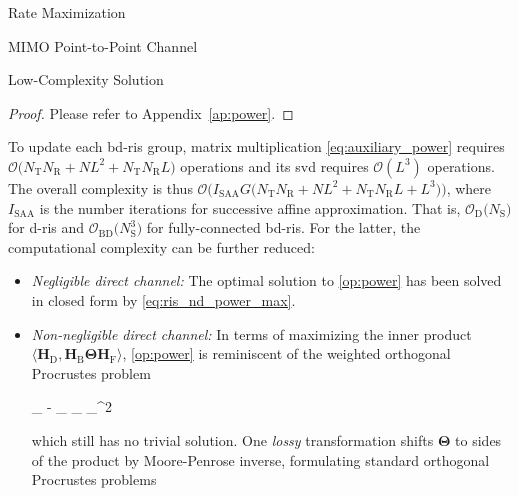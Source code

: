 \documentclass[journal]{IEEEtran}
\begin{document}
\begin{section}{Rate Maximization}
\begin{subsection}{MIMO Point-to-Point Channel}
\begin{subsubsection}{Low-Complexity Solution}
				\begin{proof}
					Please refer to Appendix~\ref{ap:power}.
				\end{proof}

				To update each \gls{bd}-\gls{ris} group, matrix multiplication \eqref{eq:auxiliary_power} requires $\mathcal{O}\bigl(N_\mathrm{T} N_\mathrm{R} + NL^2+N_\mathrm{T} N_\mathrm{R} L\bigr)$ operations and its \gls{svd} requires $\mathcal{O}(L^3)$ operations.
				The overall complexity is thus $\mathcal{O}\bigl(I_\text{SAA} G \bigl(N_\mathrm{T} N_\mathrm{R} + NL^2+N_\mathrm{T} N_\mathrm{R} L + L^3\bigr)\bigr)$, where $I_\text{SAA}$ is the number iterations for successive affine approximation.
				That is, $\mathcal{O}_\mathrm{D}\bigl(N_\mathrm{S}\bigr)$ for \gls{d}-\gls{ris} and $\mathcal{O}_\mathrm{BD}\bigl(N_\mathrm{S}^3\bigr)$ for fully-connected \gls{bd}-\gls{ris}.
				For the latter, the computational complexity can be further reduced:
				\begin{itemize}
					\item \emph{Negligible direct channel:} The optimal solution to \eqref{op:power} has been solved in closed form by \eqref{eq:ris_nd_power_max}.
					\item \emph{Non-negligible direct channel:} In terms of maximizing the inner product $\langle \mathbf{H}_\mathrm{D}, \mathbf{H}_\mathrm{B} \mathbf{\Theta} \mathbf{H}_\mathrm{F} \rangle$, \eqref{op:power} is reminiscent of the weighted orthogonal Procrustes problem \cite{Gower2004}
					\begin{mini!}
						{\scriptstyle{\mathbf{\Theta}}}{\lVert \mathbf{H}_ - _ \mathbf{\Theta} _\mathrm{F} \rVert _^2}{\label{op:procrustes_wt}}{}
					\end{mini!}
					which still has no trivial solution.
					One \emph{lossy} transformation \cite{Bell2003} shifts $\mathbf{\Theta}$ to sides of the product by Moore-Penrose inverse, formulating standard orthogonal Procrustes problems

\end{itemize}
\end{subsubsection}
\end{subsection}
\end{section}
\end{document}
